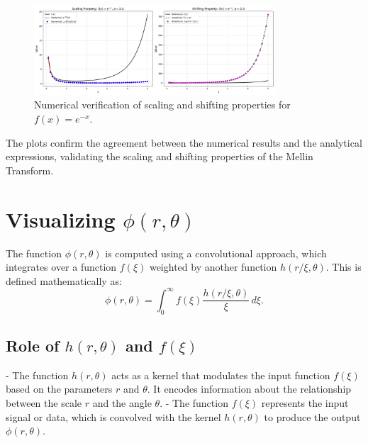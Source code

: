 \documentclass[a4paper, 12pt]{article}
\begin{document}
\begin{figure}[H]
    \centering
    \includegraphics[width=0.8\textwidth]{Shifting and scaling.png}
    \caption{Numerical verification of scaling and shifting properties for $f(x) = e^{-x}$.}
    \label{fig:scaling_shifting}
\end{figure}

The plots confirm the agreement between the numerical results and the analytical expressions, validating the scaling and shifting properties of the Mellin Transform.


\section{Visualizing $\phi(r, \theta)$}

The function $\phi(r, \theta)$ is computed using a convolutional approach, which integrates over a function $f(\xi)$ weighted by another function $h(r/\xi, \theta)$. This is defined mathematically as:
\begin{equation}
\phi(r, \theta) = \int_{0}^{\infty} f(\xi) \frac{h(r/\xi, \theta)}{\xi} \, d\xi.
\end{equation}

\subsection{Role of $h(r, \theta)$ and $f(\xi)$}
- The function $h(r, \theta)$ acts as a kernel that modulates the input function $f(\xi)$ based on the parameters $r$ and $\theta$. It encodes information about the relationship between the scale $r$ and the angle $\theta$.
- The function $f(\xi)$ represents the input signal or data, which is convolved with the kernel $h(r, \theta)$ to produce the output $\phi(r, \theta)$.
\end{document}
